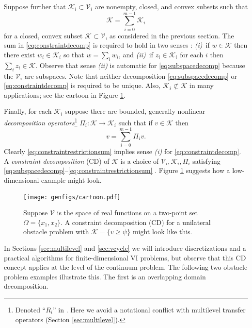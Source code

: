 \documentclass[letterpaper,final,12pt,reqno]{amsart}
\theoremstyle{cstyle}
\theoremstyle{cstyle*}
\theoremstyle{dstyle}
\numberwithin{equation}{section}
\numberwithin{figure}{section}
\numberwithin{table}{section}
\numberwithin{theorem}{section}
\newcommand{\cK}{\mathcal{K}}
\newcommand{\cV}{\mathcal{V}}
\begin{document}
Suppose further that $\cK_i \subset \cV_i$ are nonempty, closed, and convex subsets such that
\begin{equation}
\cK = \sum_{i=0}^{m-1} \cK_i \label{eq:constraintdecomp}
\end{equation}
for a closed, convex subset $\cK \subset \cV$, as considered in the previous section.  The sum in \eqref{eq:constraintdecomp} is required to hold in two senses \cite{TaiTseng2002}: \emph{(i)}~if $w \in \cK$ then there exist $w_i \in \cK_i$ so that $w = \sum_i w_i$, and \emph{(ii)}~if $z_i \in \cK_i$ for each $i$ then $\sum_i z_i \in \cK$.  Observe that sense \emph{(ii)} is automatic for \eqref{eq:subspacedecomp} because the $\cV_i$ are subspaces.  Note that neither decomposition \eqref{eq:subspacedecomp} or \eqref{eq:constraintdecomp} is required to be unique.  Also, $\cK_i \not\subset \cK$ in many applications; see the cartoon in Figure \ref{fig:cartoon}.

Finally, for each $\cK_i$ suppose there are bounded, generally-nonlinear \emph{decomposition operators}\footnote{Denoted ``$R_i$'' in \cite{Tai2003}.  Here we avoid a notational conflict with multilevel transfer operators (Section \ref{sec:multilevel}).} $\Pi_i : \cK \to \cK_i$ such that if $v \in \cK$ then
\begin{equation}
v = \sum_{i=0}^{m-1} \Pi_i v.  \label{eq:constraintrestrictionsum}
\end{equation}
Clearly \eqref{eq:constraintrestrictionsum} implies sense \emph{(i)} for \eqref{eq:constraintdecomp}. A \emph{constraint decomposition} (CD) of $\cK$ is a choice of $\cV_i,\cK_i,\Pi_i$ satisfying \eqref{eq:subspacedecomp}--\eqref{eq:constraintrestrictionsum} \cite{Tai2003}.  Figure \ref{fig:cartoon} suggests how a low-dimensional example might look.

\begin{figure}[ht]
\texttt{[image: genfigs/cartoon.pdf]}
\caption{Suppose $\mathcal{V}$ is the space of real functions on a two-point set $\Omega=\{x_1,x_2\}$.  A constraint decomposition (CD) for a unilateral obstacle problem with $\mathcal{K}=\{v\ge \psi\}$ might look like this.}
\label{fig:cartoon}
\end{figure}

In Sections \ref{sec:multilevel} and \ref{sec:vcycle} we will introduce discretizations and a practical algorithms for finite-dimensional VI problems, but observe that this CD concept applies at the level of the continuum problem.  The following two obstacle problem examples illustrate this.  The first is an overlapping domain decomposition.
\end{document}
